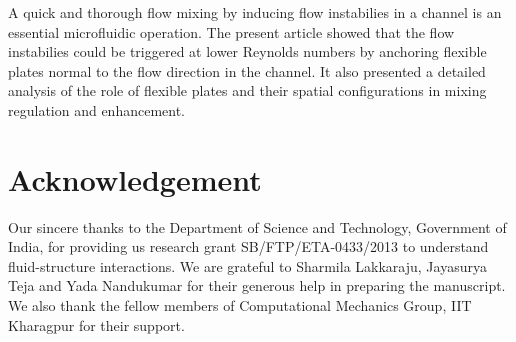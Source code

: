 \documentclass[aps,pre,twocolumn,aps,longbibliography]{revtex4-1}
\begin{document}
	A quick and thorough flow mixing by inducing flow instabilies in a channel is an essential microfluidic operation. The present article showed that the flow instabilies could be triggered at lower Reynolds numbers by anchoring flexible plates normal to the flow direction in the channel. It also presented a detailed analysis of the role of flexible plates and their spatial configurations in mixing regulation and enhancement.
	
	\section{Acknowledgement}
	Our sincere thanks to the Department of Science and Technology, Government of India, for providing us research grant SB/FTP/ETA-0433/2013 to understand fluid-structure interactions. We are grateful to Sharmila Lakkaraju, Jayasurya Teja and Yada Nandukumar for their generous help in preparing the manuscript. We also thank the fellow members of Computational Mechanics Group, IIT Kharagpur for their support.
	
	
	
	
	
\end{document}
